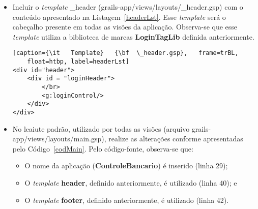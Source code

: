 \begin{itemize}
\lstset{language=XML}
\begin{lstlisting}[caption={\it   Template}   {\bf  \_footer.gsp},   frame=trBL,
    float=htbp, label=footerLst] 
<div id="footer">
 <hr/> &copy; DC - UFSCar
</div>
\end{lstlisting}

\item Incluir o  {\it template} \_header (grails-app/views/layouts/\_header.gsp)
  com o  conteúdo apresentado  na Listagem~\ref{headerLst}. Esse  {\it template}
  será o cabeçalho presente em todas as visões da aplicação. Observa-se que esse
  {\it  template} utiliza  a  biblioteca de  marcas  {\bf LoginTagLib}  definida
  anteriormente. 

\lstset{language=XML}
\begin{lstlisting}[caption={\it   Template}   {\bf  \_header.gsp},   frame=trBL,
    float=htbp, label=headerLst]
<div id="header">
    <div id = "loginHeader">
        </br>
        <g:loginControl/>
    </div>
</div>
\end{lstlisting}

\newpage

\item    No     leaiute    padrão,    utilizado    por     todas    as    visões
  (arquivo  grails-app/views/layouts/main.gsp), realize  as  alterações conforme
  apresentadas pelo Código~\ref{codMain}.  Pelo código-fonte, observa-se que:

\begin{itemize}

\vspace{0.3cm}

\item O nome da aplicação ({\bf ControleBancario}) é inserido (linha 29);

\vspace{0.3cm}

\item O {\it template} {\bf  header}, definido anteriormente, é utilizado (linha
  40); e 

\vspace{0.3cm}

\item O {\it template} {\bf  footer}, definido anteriormente, é utilizado (linha
  42). 

\end{itemize}


\end{itemize}
